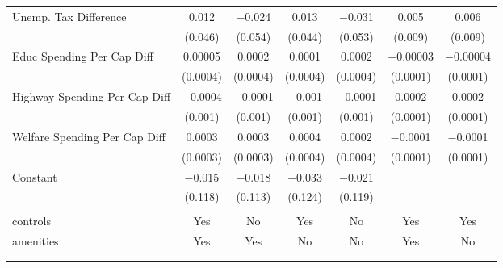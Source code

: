 \begin{table}[!htbp]
\begin{tabular}{@{\extracolsep{5pt}}lcccccc}
  Unemp. Tax Difference & 0.012 & $-$0.024 & 0.013 & $-$0.031 & 0.005 & 0.006 \\ 
  & (0.046) & (0.054) & (0.044) & (0.053) & (0.009) & (0.009) \\ 
  Educ Spending Per Cap Diff & 0.00005 & 0.0002 & 0.0001 & 0.0002 & $-$0.00003 & $-$0.00004 \\ 
  & (0.0004) & (0.0004) & (0.0004) & (0.0004) & (0.0001) & (0.0001) \\ 
  Highway Spending Per Cap Diff & $-$0.0004 & $-$0.0001 & $-$0.001 & $-$0.0001 & 0.0002 & 0.0002 \\ 
  & (0.001) & (0.001) & (0.001) & (0.001) & (0.0001) & (0.0001) \\ 
  Welfare Spending Per Cap Diff & 0.0003 & 0.0003 & 0.0004 & 0.0002 & $-$0.0001 & $-$0.0001 \\ 
  & (0.0003) & (0.0003) & (0.0004) & (0.0004) & (0.0001) & (0.0001) \\ 
  Constant & $-$0.015 & $-$0.018 & $-$0.033 & $-$0.021 &  &  \\ 
  & (0.118) & (0.113) & (0.124) & (0.119) &  &  \\ 
 \hline \\[-1.8ex] 
controls & Yes & No & Yes & No & Yes & Yes \\ 
amenities & Yes & Yes & No & No & Yes & No \\ 
\hline \\[-1.8ex] 
\hline 
\hline \\[-1.8ex] 
\end{tabular} 
\end{table} 
